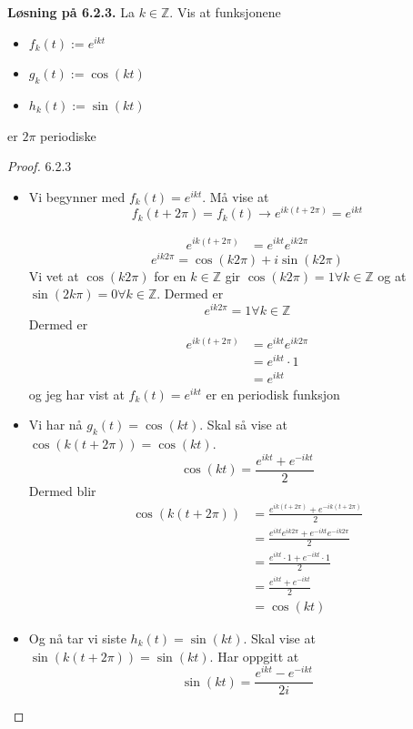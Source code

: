 \documentclass[a4paper,norsk]{article}
\newenvironment{oppgave}[1]%
	{\trivlist{}\item\relax\textbf{Løsning på #1.}\medspace}%
	{\endtrivlist}
\begin{document}
\begin{oppgave}{6.2.3}
La $ k \in \mathbb{Z} $. Vis at funksjonene 
\begin{itemize}
  \item $ f_k(t) := e^{ikt} $
  \item $ g_k(t) := \cos(kt)   $  
  \item $ h_k(t) := \sin(kt)  $ 
\end{itemize}
er $ 2\pi $ periodiske


\begin{proof}{6.2.3}
\begin{itemize}
  \item Vi begynner med $ f_k(t) = e^{ikt} $. Må vise at 
  \[
      f_k(t+ 2\pi) = f_k(t) \rightarrow e^{ik \left( t + 2\pi \right) } = e^{ikt}
  \]

  \begin{align*}
    e^{ik \left( t + 2\pi \right) } &= e^{ikt} e^{ik2\pi}
  \end{align*}
  \[
      e^{ik2\pi}  = \cos(k2\pi)  + i \sin(k2\pi) 
  \]
  Vi vet at $ \cos(k 2\pi)   $ for en $ k \in \mathbb{Z} $ gir $ \cos(k 2\pi) =1  \forall k \in \mathbb{Z}$ og at $ \sin(2k \pi) = 0 \forall k \in \mathbb{Z}  $. Dermed er
  \[
      e^{ik2\pi} = 1 \forall k \in  \mathbb{Z}
  \]
  Dermed er 
  \begin{align*}
    e^{ik \left( t + 2\pi \right) } &= e^{ikt} e^{ik2\pi}\\
    &= e^{ikt} \cdot 1\\
    &= e^{ikt}
  \end{align*}
  og jeg har vist at $ f_k(t) = e^{ikt} $  er en periodisk funksjon
  \item Vi har nå $ g_k(t) = \cos(kt)   $. Skal så vise at $ \cos(k \left( t+2\pi \right) ) = \cos(kt)     $. 
  \[
      \cos(kt)  = \frac{ e^{ikt} + e^{-ikt}  }{ 2 }
  \]
  Dermed blir 
  \begin{align*}
    \cos(k \left( t + 2\pi \right) )  &= \frac{ e^{ik \left( t + 2\pi \right) } + e^{-ik \left( t + 2 \pi  \right) }   }{ 2 }\\
    &= \frac{ e^{ikt} e^{ik2 \pi } + e^{-ikt} e^{-ik2 \pi }   }{ 2}\\
    &= \frac{ e^{ikt} \cdot 1 + e^{-ikt} \cdot 1 }{ 2 } \\
    &= \frac{ e^{ikt} + e^{-ikt}  }{ 2 } \\
    &= \cos(kt)  
  \end{align*}
  
  \item Og nå tar vi siste $ h_k(t) = \sin(kt)  $. Skal vise at $ \sin(k \left( t + 2 \pi  \right) ) = \sin(kt)   $. Har oppgitt at
  \[
      \sin(kt) = \frac{ e^{ikt} - e^{-ikt}  }{ 2i }
  \]
  

\end{itemize}
\end{proof}
\end{oppgave}
\end{document}
